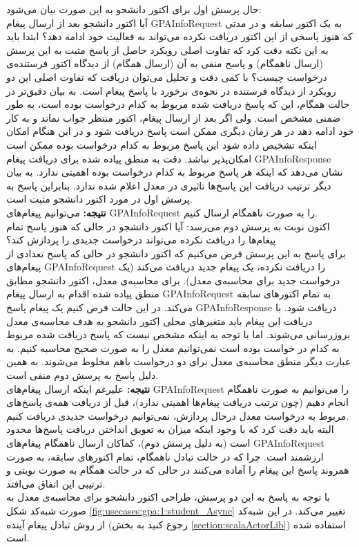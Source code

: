 \begin{enumerate}
حال پرسش اول برای اکتور دانشجو به این صورت بیان می‌شود:\\
آیا اکتور دانشجو بعد از ارسال پیغام GPAInfoRequest به یک اکتور سابقه و در مدتی که هنوز پاسخی از این اکتور دریافت نکرده می‌تواند به فعالیت خود ادامه دهد؟ ابتدا باید به این نکته دقت کرد که تفاوت اصلی رویکرد حاصل از پاسخ مثبت به این پرسش (ارسال ناهمگام) و پاسخ منفی به آن (ارسال همگام) از دیدگاه اکتور فرستنده‌ی درخواست چیست؟ با کمی دقت و تحلیل می‌توان دریافت که تفاوت اصلی این دو رویکرد از دیدگاه فرستنده در نحوه‌ی برخورد با پاسخ پیغام است. به بیان دقیق‌تر در حالت همگام، این که پاسخ دریافت شده مربوط به کدام درخواست بوده است، به طور ضمنی مشخص است. ولی اگر بعد از ارسال پیغام، اکتور منتظر جواب نماند و به کار خود ادامه دهد در هر زمان دیگری ممکن است پاسخ دریافت شود و در این هنگام امکان اینکه تشخیص داده شود این پاسخ مربوط به کدام درخواست بوده ممکن است امکان‌پذیر نباشد. دقت به منطق پیاده شده برای دریافت پیغام GPAInfoResponse نشان می‌دهد که اینکه هر پاسخ مربوط به کدام درخواست بوده اهمیتی ندارد. به بیان دیگر ترتیب دریافت این پاسخ‌ها تاثیری در معدل اعلام شده ندارد. بنابراین پاسخ به پرسش اول در مورد اکتور دانشجو مثبت است. \\
\textbf{نتیجه:}
می‌توانیم پیغام‌های GPAInfoRequest را به صورت ناهمگام ارسال کنیم.\\
اکنون نوبت به پرسش دوم می‌رسد: آیا اکتور دانشجو در حالی که هنوز پاسخ تمام پیغام‌ها را دریافت نکرده می‌تواند درخواست جدیدی را پردازش کند؟\\
برای پاسخ به این پرسش فرض می‌کنیم که اکتور دانشجو در حالی که پاسخ تعدادی از پیغام‌های GPAInfoRequest را دریافت نکرده، یک پیغام جدید  دریافت می‌کند (یک درخواست جدید برای محاسبه‌ی معدل). برای محاسبه‌ی معدل، اکتور دانشجو مطابق منطق پیاده شده اقدام به ارسال پیغام GPAInfoRequest به تمام اکتور‌های سابقه می‌کند. در این حالت فرض کنیم یک پیغام پاسخ GPAInfoResponse دریافت شود. با دریافت این پیغام باید متغیرهای محلی اکتور دانشجو به هدف محاسبه‌ی معدل بروزرسانی می‌شوند. اما با توجه به اینکه مشخص نیست که پاسخ دریافت شده مربوط به کدام در خواست بوده است نمی‌توانیم معدل را به صورت صحیح محاسبه کنیم. به عبارت دیگر منطق محاسبه‌ی معدل برای دو درخواست باهم مخلوط می‌شوند. به همین دلیل پاسخ به پرسش دوم منفی است.\\
\textbf{نتیجه:}
علیرغم اینکه ارسال پیغام‌های GPAInfoRequest را می‌توانیم به صورت ناهمگام انجام دهیم (چون ترتیب دریافت پیغام‌ها اهمیتی ندارد)، قبل از دریافت همه‌ی پاسخ‌های مربوط به درخواست معدل درحال پردازش، نمی‌توانیم درخواست جدیدی دریافت کنیم.\\
البته باید دقت کرد که با وجود اینکه میزان به تعویق انداختن دریافت پاسخ‌ها محدود است (به دلیل پرسش دوم)، کماکان ارسال ناهمگام پیغام‌های  GPAInfoRequest ارزشمند است. چرا که در حالت تبادل ناهمگام، تمام اکتورهای سابقه، به صورت همروند پاسخ این پیغام را آماده می‌کنند در حالی که در حالت همگام به صورت نوبتی و ترتیبی این اتفاق می‌افتد.\\
با توجه به پاسخ به این دو پرسش، طراحی اکتور دانشجو برای محاسبه‌ی معدل به صورت شبه‌کد شکل \ref{fig:usecases:gpa:1:student_Async} تغییر می‌کند. در این شبه‌کد از روش تبادل پیغام  \gls{آینده} (رجوع کنید به بخش \ref{section:scalaActorLib}) استفاده شده است.


\end{enumerate}
